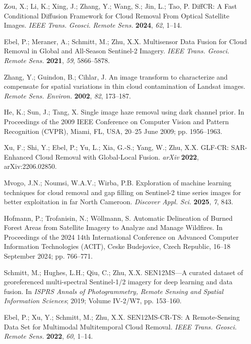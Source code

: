 Zou, X.; Li, K.; Xing, J.; Zhang, Y.; Wang, S.; Jin, L.; Tao, P. DiffCR: A Fast Conditional Diffusion Framework for Cloud Removal From Optical Satellite Images. {\em IEEE Trans. Geosci. Remote Sens.} {\bf 2024}, {\em 62}, 1--14.

Ebel, P.; Meraner, A.; Schmitt, M.; Zhu, X.X. Multisensor Data Fusion for Cloud Removal in Global and All-Season Sentinel-2 Imagery. {\em IEEE Trans. Geosci. Remote Sens.} {\bf 2021}, {\em 59}, 5866--5878.

Zhang, Y.; Guindon, B.; Cihlar, J. An image transform to characterize and compensate for spatial variations in thin cloud contamination of Landsat images. {\em Remote Sens. Environ.} {\bf 2002}, {\em 82}, 173--187.

He, K.; Sun, J.; Tang, X. Single image haze removal using dark channel prior. In Proceedings of the 2009 IEEE Conference on Computer Vision and Pattern Recognition (CVPR), Miami, FL, USA, 20–25 June 2009; pp. 1956--1963.

Xu, F.; Shi, Y.; Ebel, P.; Yu, L.; Xia, G.-S.; Yang, W.; Zhu, X.X. GLF-CR: SAR-Enhanced Cloud Removal with Global-Local Fusion. {\em arXiv} {\bf 2022}, arXiv:2206.02850.

Mvogo, J.N.; Noumsi, W.A.V.; Wirba, P.B. Exploration of machine learning techniques for cloud removal and gap filling on Sentinel-2 time series images for better exploitation in far North Cameroon. {\em Discover Appl. Sci.} {\bf 2025}, {\em 7}, 843.

Hofmann, P.; Trofanisin, N.; Wöllmann, S. Automatic Delineation of Burned Forest Areas from Satellite Imagery to Analyze and Manage Wildfires. In Proceedings of the 2024 14th International Conference on Advanced Computer Information Technologies (ACIT), Ceske Budejovice, Czech Republic, 16–18 September 2024; pp. 766--771.

Schmitt, M.; Hughes, L.H.; Qiu, C.; Zhu, X.X. SEN12MS—A curated dataset of georeferenced multi-spectral Sentinel-1/2 imagery for deep learning and data fusion. In {\em ISPRS Annals of Photogrammetry, Remote Sensing and Spatial Information Sciences}; 2019; Volume IV-2/W7, pp. 153--160.

Ebel, P.; Xu, Y.; Schmitt, M.; Zhu, X.X. SEN12MS-CR-TS: A Remote-Sensing Data Set for Multimodal Multitemporal Cloud Removal. {\em IEEE Trans. Geosci. Remote Sens.} {\bf 2022}, {\em 60}, 1--14.

